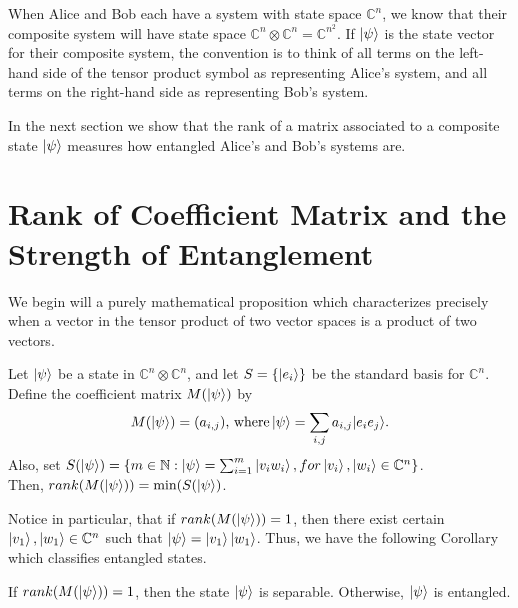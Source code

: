 When Alice and Bob each have a system with state space ${\mathbb{C}}^n$, we know that their composite system will have state space ${\mathbb{C}}^n \otimes {\mathbb{C}}^n={\mathbb{C}}^{n^2}$.  If $\ket{\psi}$ is the state vector for their composite system, the convention is to think of all terms on the left-hand side of the tensor product symbol as representing Alice's system, and all terms on the right-hand side as representing Bob's system.  

In the next section we show that the rank of a matrix associated to a composite state $\ket{\psi}$ measures how entangled Alice's and Bob's systems are.

\pagebreak

\section{Rank of Coefficient Matrix and the Strength of Entanglement}

We begin will a purely mathematical proposition which characterizes precisely when a vector in the tensor product of two vector spaces is a product of two vectors.

\begin{prop}
\label{rank prop}
Let $\ket{\psi}$ be a state in $\mathbb{C}^n \otimes \mathbb{C}^n$, and let $S=\{\ket{e_i}\}$ be the standard basis for $\mathbb{C}^n$. Define the coefficient matrix $M(\ket{\psi})$ by
\begin{equation}
M(\ket{\psi})=(a_{i,j}) \textrm{, where}\ket{\psi}=\sum\limits_{i,j}a_{i,j}|e_i e_j\rangle . 
\end{equation}
Also, set $S(\ket{\psi})=\{m\in \mathbb{N}: \ket{\psi}=\sum_{i=1}^m\ket{v_i w_i}, for \ket{v_i}, \ket{w_i} \in \mathbb{C}^n\}$.\\  Then, $rank(M(\ket{\psi}))=\textrm{min} (S(\ket{\psi})$.
\end{prop}

Notice in particular, that if $rank(M(\ket{\psi}))=1$, then there exist certain $\ket{v_1}, \ket{w_1} \in \mathbb{C}^n$ such that $\ket{\psi}=\ket{v_1}\ket{w_1}$.  Thus, we have the following Corollary which classifies entangled states.
\begin{corollary}
If $rank(M(\ket{\psi}))=1$, then the state $\ket{\psi}$ is separable. Otherwise, $\ket{\psi}$ is entangled.
\end{corollary}


